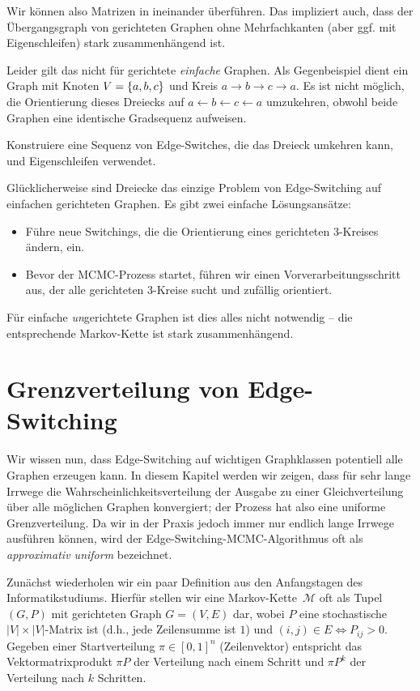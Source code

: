 Wir können also Matrizen in \msz ineinander überführen.
Das impliziert auch, dass der Übergangsgraph von gerichteten Graphen ohne Mehrfachkanten (aber ggf. mit Eigenschleifen) stark zusammenhängend ist.

Leider gilt das nicht für gerichtete \emph{einfache} Graphen.
Als Gegenbeispiel dient ein Graph mit Knoten $V = \left\{a,b,c\right\}$ und Kreis $a \to b \to c \to a$.
Es ist nicht möglich, die Orientierung dieses Dreiecks auf $a \leftarrow b \leftarrow c \leftarrow a$ umzukehren, obwohl beide Graphen eine identische Gradsequenz aufweisen.

\begin{exercise}
    Konstruiere eine Sequenz von Edge-Switches, die das Dreieck umkehren kann, und Eigenschleifen verwendet.
\end{exercise}

Glücklicherweise sind Dreiecke das einzige Problem von Edge-Switching auf einfachen gerichteten Graphen.
Es gibt zwei einfache Lösungsansätze:
\begin{itemize}
    \item Führe neue Switchings, die die Orientierung eines gerichteten 3-Kreises ändern, ein.
    \item Bevor der MCMC-Prozess startet, führen wir einen Vorverarbeitungsschritt aus, der alle gerichteten 3-Kreise sucht und zufällig orientiert.
\end{itemize}

Für einfache \emph{un}gerichtete Graphen ist dies alles nicht notwendig -- die entsprechende Markov-Kette ist stark zusammenhängend.

\section{Grenzverteilung von Edge-Switching}
Wir wissen nun, dass Edge-Switching auf wichtigen Graphklassen potentiell alle Graphen erzeugen kann.
In diesem Kapitel werden wir zeigen, dass für sehr lange Irrwege die Wahrscheinlichkeitsverteilung der Ausgabe zu einer Gleichverteilung über alle möglichen Graphen konvergiert;
der Prozess hat also eine uniforme Grenzverteilung.
Da wir in der Praxis jedoch immer nur endlich lange Irrwege ausführen können, wird der Edge-Switching-MCMC-Algorithmus oft als \emph{approximativ uniform} bezeichnet.

Zunächst wiederholen wir ein paar Definition aus den Anfangstagen des Informatikstudiums.
Hierfür stellen wir eine Markov-Kette~$\mathcal M$ oft als Tupel $(G, P)$ mit gerichteten Graph $G = (V, E)$ dar, wobei $P$ eine stochastische $|V| \times |V|$-Matrix ist (d.h., jede Zeilensumme ist $1$) und $(i, j) \in E \Leftrightarrow P_{ij} > 0$.
Gegeben einer Startverteilung $\pi \in [0, 1]^n$ (Zeilenvektor) entspricht das Vektormatrixprodukt $\pi P$ der Verteilung nach einem Schritt und $\pi P^k$ der Verteilung nach $k$ Schritten.


